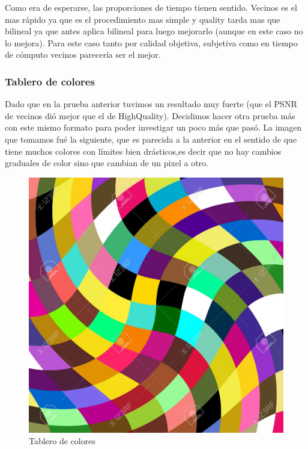 {Como era de esperarse, las proporciones de tiempo tienen sentido. Vecinos es el mas rápido ya que es el procedimiento mas simple y quality tarda mas que bilineal ya que antes aplica bilineal para luego mejorarlo (aunque en este caso no lo mejora). Para este caso tanto por calidad objetiva, subjetiva como en tiempo de cómputo vecinos parecería ser el mejor.



\subsubsection{Tablero de colores}
Dado que en la prueba anterior tuvimos un resultado muy fuerte (que el PSNR de vecinos dió mejor que el de HighQuality). Decidimos hacer otra prueba más con este mismo formato para poder investigar un poco más que pasó.
La imagen que tomamos fué la siguiente, que es parecida a la anterior en el sentido de que tiene muchos colores con límites bien drásticos,es decir que no hay cambios graduales de color sino que cambian de un pixel a otro. 
\begin{figure}[!htb]
\begin{center}
       \includegraphics[scale=0.2]{imagenes/cuadrados_colores.png}
       \caption{Tablero de colores}
        \end{center}


\end{figure}}
